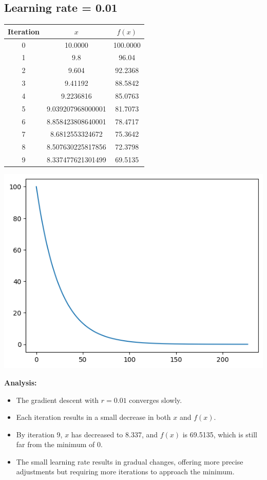 \documentclass[12pt]{article}
\begin{document}
\subsection{Learning rate = 0.01}
\begin{center}
\begin{tabular}{|c|c|c|}
\hline
Iteration & $x$ & $f(x)$ \\
\hline
0 & 10.0000 & 100.0000 \\
1 & 9.8 & 96.04 \\
2 & 9.604 & 92.2368 \\
3 & 9.41192 & 88.5842 \\
4 & 9.2236816 & 85.0763 \\
5 & 9.039207968000001 & 81.7073 \\
6 & 8.858423808640001 & 78.4717 \\
7 & 8.6812553324672 & 75.3642 \\
8 & 8.507630225817856 & 72.3798 \\
9 & 8.337477621301499 & 69.5135 \\
\hline
\end{tabular}
\end{center}

\begin{center}
    \includegraphics[scale=0.7]{output_0.01.png}
\end{center}

\textbf{Analysis:}
\begin{itemize}
    \item The gradient descent with \( r = 0.01 \) converges slowly. 
    \item Each iteration results in a small decrease in both \( x \) and \( f(x) \).
    \item By iteration 9, \( x \) has decreased to 8.337, and \( f(x) \) is 69.5135, which is still far from the minimum of 0.
    \item The small learning rate results in gradual changes, offering more precise adjustments but requiring more iterations to approach the minimum.
\end{itemize}
\end{document}
